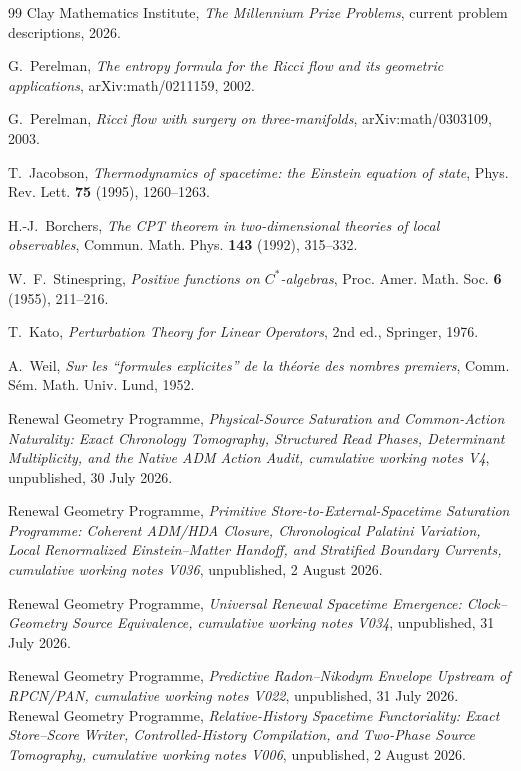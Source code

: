 \documentclass[11pt]{article}
\theoremstyle{definition}
\theoremstyle{remark}
\begin{document}
\begin{thebibliography}{99}
Clay Mathematics Institute,
\emph{The Millennium Prize Problems}, current problem descriptions, 2026.

G.~Perelman,
\emph{The entropy formula for the Ricci flow and its geometric applications},
arXiv:math/0211159, 2002.

G.~Perelman,
\emph{Ricci flow with surgery on three-manifolds},
arXiv:math/0303109, 2003.

T.~Jacobson,
\emph{Thermodynamics of spacetime: the Einstein equation of state},
Phys. Rev. Lett. \textbf{75} (1995), 1260--1263.

H.-J.~Borchers,
\emph{The CPT theorem in two-dimensional theories of local observables},
Commun. Math. Phys. \textbf{143} (1992), 315--332.

W.~F.~Stinespring,
\emph{Positive functions on $C^*$-algebras},
Proc. Amer. Math. Soc. \textbf{6} (1955), 211--216.

T.~Kato,
\emph{Perturbation Theory for Linear Operators}, 2nd ed., Springer, 1976.

A.~Weil,
\emph{Sur les ``formules explicites'' de la th\'eorie des nombres premiers},
Comm. S\'em. Math. Univ. Lund, 1952.

Renewal Geometry Programme,
\emph{Physical-Source Saturation and Common-Action Naturality: Exact Chronology
Tomography, Structured Read Phases, Determinant Multiplicity, and the Native
ADM Action Audit, cumulative working notes V4}, unpublished, 30 July 2026.


Renewal Geometry Programme,
\emph{Primitive Store-to-External-Spacetime Saturation Programme: Coherent
ADM/HDA Closure, Chronological Palatini Variation, Local Renormalized
Einstein--Matter Handoff, and Stratified Boundary Currents, cumulative working
notes V036}, unpublished, 2 August 2026.

Renewal Geometry Programme,
\emph{Universal Renewal Spacetime Emergence: Clock--Geometry Source
Equivalence, cumulative working notes V034}, unpublished, 31 July 2026.

Renewal Geometry Programme,
\emph{Predictive Radon--Nikodym Envelope Upstream of RPCN/PAN, cumulative
working notes V022}, unpublished, 31 July 2026.
Renewal Geometry Programme,
\emph{Relative-History Spacetime Functoriality: Exact Store--Score Writer,
Controlled-History Compilation, and Two-Phase Source Tomography, cumulative
working notes V006}, unpublished, 2 August 2026.

\end{thebibliography}
\end{document}
